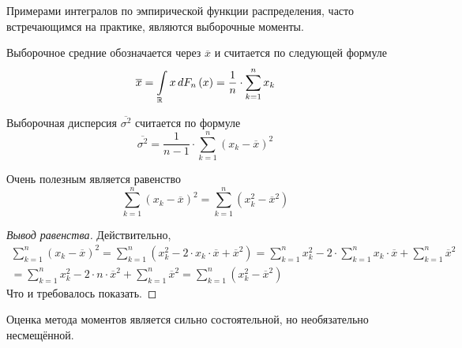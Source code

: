 Примерами интегралов по эмпирической функции распределения, часто встречающимся
на практике, являются выборочные моменты.

\begin{definition}
  Выборочное средние обозначается через $\overline{x}$
  и считается по следующей формуле
  \begin{equation*}
    \overline{x}
    = \integrall{\mathbb{R}}{d\cdfn{x}}{x}
    = \frac{1}{n} \cdot \sum_{k=1}^{n} x_k
  \end{equation*}
\end{definition}

\begin{definition}
  Выборочная дисперсия $\overline{\sigma^2}$
  считается по формуле
  \begin{equation*}
    \overline{\sigma^2}
    = \frac{1}{n-1} \cdot \sum_{k=1}^n \left( x_k-\overline{x} \right)^2
  \end{equation*}
\end{definition}

\begin{remark}
  Очень полезным является равенство
  \begin{equation*}
    \sum_{k=1}^{n} \left( x_k - \overline{x} \right)^2
    = \sum_{k=1}^{n} \left( x_k^2 - \overline{x}^2 \right)
  \end{equation*}
\end{remark}
\begin{proof}[Вывод равенства]
  Действительно,
  \begin{equation*}
    \begin{split}
      \sum_{k=1}^{n} \left( x_k - \overline{x} \right)^2
      = \sum_{k=1}^{n} \left(
        x_k^2 - 2 \cdot x_k \cdot \overline{x} + \overline{x}^2 \right)
      = \sum_{k=1}^{n} x_k^2 - 2 \cdot \sum_{k=1}^{n} x_k \cdot \overline{x}
        + \sum_{k=1}^{n} \overline{x}^2 \\
      = \sum_{k=1}^{n} x_k^2 - 2 \cdot n \cdot \overline{x}^2
        + \sum_{k=1}^{n} \overline{x}^2
      = \sum_{k=1}^{n} \left( x_k^2 - \overline{x}^2 \right)
    \end{split}
  \end{equation*}
  Что и требовалось показать.
\end{proof}

\begin{remark}
  Оценка метода моментов является сильно состоятельной, но необязательно
  несмещённой.
\end{remark}

